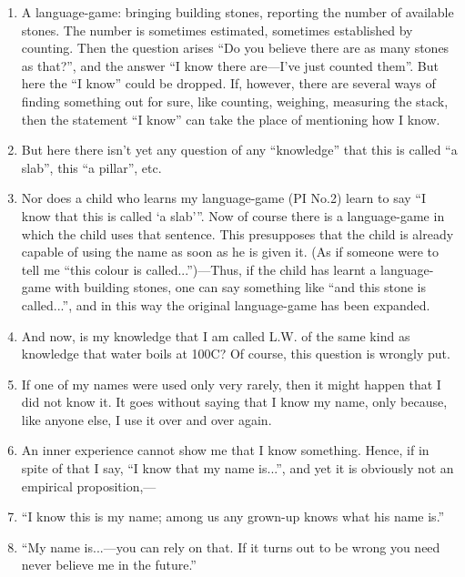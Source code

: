 \documentclass{book}
\begin{document}
\begin{enumerate}
\item
A language-game: bringing building stones, reporting the number of available
stones. The number is sometimes estimated, sometimes established by counting.
Then the question arises ``Do you believe there are as many stones as that?'',
and the answer ``I know there are---I've just counted them''. But here the ``I
know'' could be dropped. If, however, there are several ways of finding
something out for sure, like counting, weighing, measuring the stack, then the
statement ``I know'' can take the place of mentioning how I know.

\item
But here there isn't yet any question of any ``knowledge'' that this is called
``a slab'', this ``a pillar'', etc.

\item
Nor does a child who learns my language-game (PI No.2) learn to say ``I know
that this is called `a slab'\thinspace ''.  Now of course there is a
language-game in which the child uses that sentence. This presupposes that the
child is already capable of using the name as soon as he is given it. (As if
someone were to tell me ``this colour is called...'')---Thus, if the child has
learnt a language-game with building stones, one can say something like ``and
this stone is called...'', and in this way the original language-game has been
expanded.

\item
And now, is my knowledge that I am called L.W. of the same kind as knowledge
that water boils at 100C? Of course, this question is wrongly put.

\item
If one of my names were used only very rarely, then it might happen that I did
not know it. It goes without saying that I know my name, only because, like
anyone else, I use it over and over again.

\item
An inner experience cannot show me that I know something.  Hence, if in spite
of that I say, ``I know that my name is...'', and yet it is obviously not an
empirical proposition,---

\item
``I know this is my name; among us any grown-up knows what his name is.''

\item
``My name is...---you can rely on that. If it turns out to be wrong you need
never believe me in the future.''


\end{enumerate}
\end{document}

